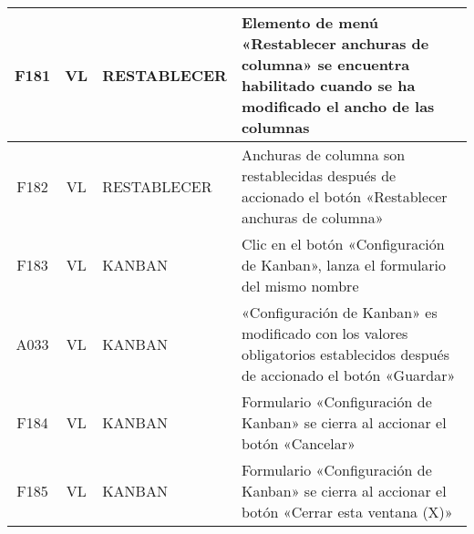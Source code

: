 \begin{landscape}
{\begin{longtable}[htb]{|c|c|p{5.0cm}|p{14.0cm}|}
F181 & VL & RESTABLECER & Elemento de menú «Restablecer anchuras de columna» se encuentra habilitado cuando se ha modificado el ancho de las columnas \\ \hline
F182 & VL & RESTABLECER & Anchuras de columna son restablecidas después de accionado el botón «Restablecer anchuras de columna» \\ \hline
F183 & VL & KANBAN & Clic en el botón «Configuración de Kanban», lanza el formulario del mismo nombre \\ \hline
A033 & VL & KANBAN & «Configuración de Kanban» es modificado con los valores obligatorios establecidos después de accionado el botón «Guardar» \\ \hline
F184 & VL & KANBAN & Formulario «Configuración de Kanban» se cierra al accionar el botón «Cancelar» \\ \hline
F185 & VL & KANBAN & Formulario «Configuración de Kanban» se cierra al accionar el botón «Cerrar esta ventana (X)» \\ \hline
\end{longtable}
}
\end{landscape}

